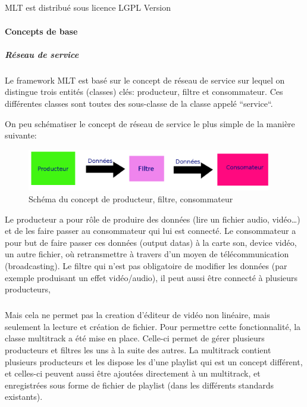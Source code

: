 \subparagraph{}

MLT est distribué sous licence LGPL Version

\paragraph{Concepts de base}

\subparagraph{Réseau de service}

\subparagraph{}

Le framework MLT est basé sur le concept de réseau de service sur
lequel on distingue trois entités (classes) clés: producteur, filtre
et consommateur. Ces différentes classes sont toutes des sous-classe
de la classe appelé ``service``.

On peu schématiser le concept de réseau de service le plus simple de
la manière suivante:

\begin{figure} [H]

  \begin{center}

    \includegraphics[width=0.95\textwidth]{images/producerConsumer}

  \end{center}

  \caption{Schéma du concept de producteur, filtre, consommateur}

  \label{Yes}

\end{figure}

Le producteur a pour rôle de produire des données (lire un fichier
audio, vidéo\ldots) et de les faire passer au consommateur qui lui est
connecté. Le consommateur a pour but de faire passer ces données (output
datas) à la carte son, device vidéo, un autre fichier, où retransmettre
à travers d'un moyen de télécommunication (broadcasting).%
Le filtre
qui n'est pas obligatoire %
de modifier les données (par exemple produisant un effet vidéo/audio),
il peut aussi être connecté à plusieurs producteurs, %

\subparagraph{}

Mais cela ne permet pas la creation d'éditeur de vidéo non linéaire,
mais seulement la lecture et création de fichier. Pour permettre cette
fonctionnalité, la classe multitrack a été mise en place. Celle-ci
permet de gérer plusieurs producteurs et filtres les uns à la suite des
autres. La multitrack contient plusieurs producteurs et les dispose les
d'une playlist qui est un concept différent, et celles-ci peuvent aussi
être ajoutées directement à un multitrack, et enregistrées sous forme
de fichier de playlist (dans les différents standards existants).

